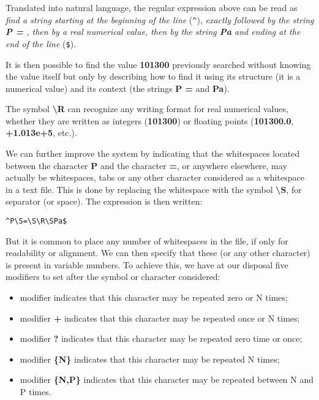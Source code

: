 Translated into natural language, the regular expression above can be read as \emph{find a string starting at the beginning of the line} (\verb+^+), \emph{exactly followed by the string {\bf P = }, then by a real numerical value, then by the string {\bf Pa} and ending at the end of the line} (\verb+$+).

It is then possible to find the value {\bf 101300} previously searched without knowing the value itself but only by describing how to find it using its structure (it is a numerical value) and its context (the strings {\bf P = } and {\bf Pa}).

The symbol {\bf \textbackslash R} can recognize any writing format for real numerical values, whether they are written as integers ({\bf 101300}) or floating points ({\bf 101300.0}, {\bf +1.013e+5}, etc.).

We can further improve the system by indicating that the whitespaces located between the character {\bf P} and the character {\bf =}, or anywhere elsewhere, may actually be whitespaces, tabs or any other character considered as a whitespace in a text file. This is done by replacing the whitespace with the symbol {\bf \textbackslash S}, for separator (or space). The expression is then written:

\lstset{language=C++, basicstyle=\normalsize}
\begin{lstlisting}[frame=TBRL]
  ^P\S=\S\R\SPa$
\end{lstlisting}

But it is common to place any number of whitespaces in the file, if only for readability or alignment. We can then specify that these (or any other character) is present in variable numbers. To achieve this, we have at our disposal five modifiers to set after the symbol or character considered:
\begin{itemize}
\item modifier {\bf *} indicates that this character may be repeated zero or N times;
\item modifier {\bf +} indicates that this character may be repeated once or N times;
\item modifier {\bf ?} indicates that this character may be repeated zero time or once;
\item modifier {\bf \{N\} } indicates that this character may be repeated N times;
\item modifier {\bf \{N,P\}} indicates that this character may be repeated between N and P times.
\end{itemize}

